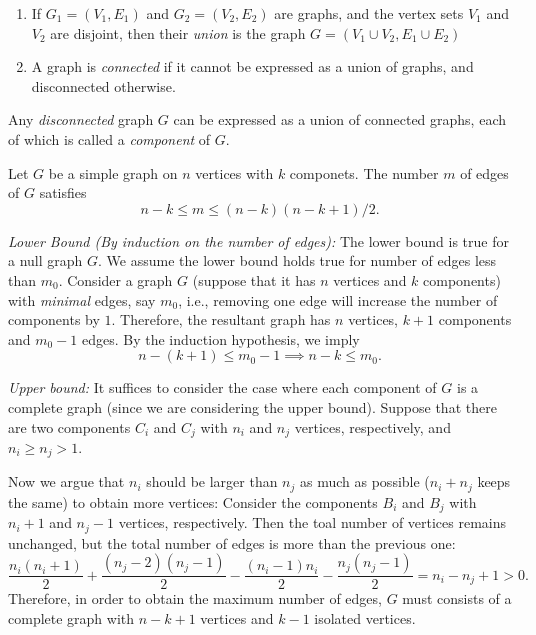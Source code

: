 \begin{definition}[Connected]
\begin{enumerate}
\item
If $G_1=(V_1,E_1)$ and $G_2=(V_2,E_2)$ are graphs,
and the vertex sets $V_1$ and $V_2$ are disjoint,
then their \emph{union} is the graph $G=(V_1\cup V_2,E_1\cup E_2)$
\item
A graph is \emph{connected} if it cannot be expressed as a union of graphs, and disconnected otherwise.
\end{enumerate}
\end{definition}

\begin{definition}[Component]
Any \emph{disconnected} graph $G$ can be expressed as a union of connected graphs, each of which is called a \emph{component} of $G$.
\end{definition}

\begin{theorem}\label{The:2:2}
Let $G$ be a simple graph on $n$ vertices with $k$ componets.
The number $m$ of edges of $G$ satisfies
\[
n-k\le m\le (n-k)(n-k+1)/2.
\]
\end{theorem}
\textit{Lower Bound (By induction on the number of edges):}
The lower bound is true for a null graph $G$.
We assume the lower bound holds true for number of edges less than $m_0$.
Consider a graph $G$ (suppose that it has $n$ vertices and $k$ components) with \emph{minimal} edges, say $m_0$, i.e., removing one edge will increase the number of components by $1$. Therefore, the resultant graph has $n$ vertices, $k+1$ components and $m_0-1$ edges. By the induction hypothesis, we imply
\[
n-(k+1)\le m_0-1\implies
n-k\le m_0.
\]

\textit{Upper bound:}
It suffices to consider the case where each component of $G$ is a complete graph (since we are considering the upper bound).
Suppose that there are two components $C_i$ and $C_j$ with $n_i$ and $n_j$ vertices, respectively, and $n_i\ge n_j>1$.

Now we argue that $n_i$ should be larger than $n_j$ as much as possible ($n_i+n_j$ keeps the same) to obtain more vertices:
Consider the components $B_i$ and $B_j$ with $n_i+1$ and $n_j-1$ vertices, respectively.
Then the toal number of vertices remains unchanged, but the total number of edges is more than the previous one:
\[
\frac{n_i(n_i+1)}{2}+\frac{(n_j-2)(n_j-1)}{2}
-
\frac{(n_i-1)n_i}{2}-\frac{n_j(n_j-1)}{2}
=
n_i-n_j+1>0.
\]
Therefore, in order to obtain the maximum number of edges, $G$ must consists of a complete graph with $n-k+1$ vertices and $k-1$ isolated vertices.

